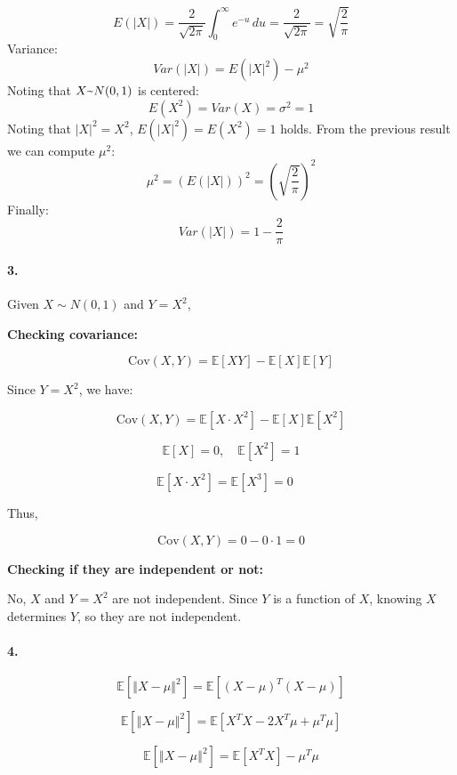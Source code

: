 \documentclass[10pt,letterpaper]{article}
\newcommand{\mytexttilde}{\raisebox{0.5ex}{\texttildelow}}
\begin{document}
\[
E(|X|) = \frac{2}{\sqrt{2 \pi}} \int_{0}^{\infty} e^{-u} \, du = \frac{2}{\sqrt{2 \pi}} = \sqrt{\frac{2}{\pi}} 
\]  
Variance:
\[
Var(|X|) = E(|X|^2) - \mu^2
\]
Noting that $X\mytexttilde N(0,1)$ is centered: 
\[
E(X^2)=Var(X)=\sigma^2=1
\]
Noting that \(|X|^2=X^2\), \(E(|X|^2)=E(X^2)=1\) holds.
From the previous result we can compute \(\mu^2\):
\[
\mu^2 = (E(|X|))^2 =(\sqrt{\frac{2}{\pi}})^2
\]
Finally:
\[
Var(|X|)=1-\frac{2}{\pi}
\]

\paragraph{3.}
Given \( X \sim N(0, 1) \) and \( Y = X^2 \),

\textbf{Checking covariance:}

\[
\text{Cov}(X, Y) = \mathbb{E}[X Y] - \mathbb{E}[X] \mathbb{E}[Y]
\]

Since \( Y = X^2 \), we have:

\[
\text{Cov}(X, Y) = \mathbb{E}[X \cdot X^2] - \mathbb{E}[X] \mathbb{E}[X^2]
\]

\[
\mathbb{E}[X] = 0, \quad \mathbb{E}[X^2] = 1
\]

\[
\mathbb{E}[X \cdot X^2] = \mathbb{E}[X^3] = 0 \quad 
\]

Thus,

\[
\text{Cov}(X, Y) = 0 - 0 \cdot 1 = 0
\]

\textbf{Checking if they are independent or not:}

No, \( X \) and \( Y = X^2 \) are not independent. Since \( Y \) is a function of \( X \), knowing \( X \) determines \( Y \), so they are not independent.


\paragraph{4.}

    \begin{equation}
        \mathbb{E}[\left \Vert X-\mu \right \Vert ^2] = 
        \mathbb{E}[(X-\mu)^T(X-\mu)]
    \end{equation}
    
    \begin{equation}
       \mathbb{E}[\left \Vert X-\mu \right \Vert ^2] = 
       \mathbb{E}[X^TX - 2X^T\mu + \mu^T\mu]
    \end{equation}

    \begin{equation}
       \mathbb{E}[\left \Vert X-\mu \right \Vert ^2] = 
       \mathbb{E}[X^TX] - \mu^T\mu
    \end{equation}
\end{document}
